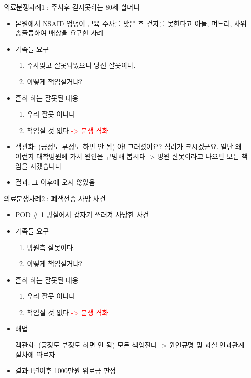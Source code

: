 \begin{Ddoing}{의료분쟁사례1 : 주사후 걷지못하는 80세 할머니}
	\begin{itemize}\tightlist
	\item 본원에서  NSAID 엉덩이  근육 주사를  맞은  후  걷지를  못한다고  아들, 며느리, 사위 총출동하여 배상을 요구한 사례
	\item 가족들 요구
		\begin{enumerate}\tightlist 
		\item 주사맞고  잘못되었으니 당신 잘못이다.  
    		\item 어떻게  책임질거냐?  
		\end{enumerate}
	\item  흔히  하는   잘못된 대응
		\begin{enumerate}\tightlist
		\item 우리  잘못  아니다
		\item 책임질 것 없다 \textcolor{red}{-> 분쟁 격화}
		\end{enumerate}
	\item 
	\begin{mdframed}[linecolor=blue,middlelinewidth=2]
	객관화:  (긍정도 부정도 하면 안 됨)
아! 그러셨어요?  심려가 크시겠군요. 일단 왜 이런지 대학병원에 가서 원인을 규명해 봅시다 -> 병원 잘못이라고 나오면 모든 책임을 지겠습니다
	\end{mdframed}
	\item 결과:  그 이후에 오지 않았음
	\end{itemize}
\end{Ddoing}


\begin{Ddoing}{의료분쟁사례2 : 폐색전증 사망 사건}
	\begin{itemize}\tightlist
	\item POD \# 1    병실에서  갑자기  쓰러져 사망한  사건 
	\item 가족들 요구 
		\begin{enumerate}\tightlist
		\item 병원측  잘못이다.   
		\item 어떻게  책임질거냐?  
		\end{enumerate}
	\item 흔히  하는   잘못된 대응
		\begin{enumerate}\tightlist
		\item 우리  잘못  아니다
		\item 책임질 것 없다 \textcolor{red}{-> 분쟁 격화} 
 		\end{enumerate}
	\item 해법
	\begin{mdframed}[linecolor=blue,middlelinewidth=2]
객관화:  (긍정도 부정도 하면 안 됨)
모든 책임진다 -> 원인규명 및 과실 인과관계 절차에 따르자
 	\end{mdframed}
	\item 결과:1년이후 1000만원 위로금 판정
	\end{itemize}  
\end{Ddoing}

